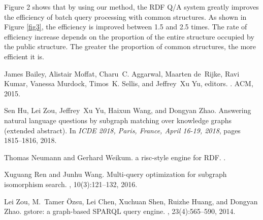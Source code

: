 \documentclass[runningheads]{llncs}
\begin{document}
Figure 2 shows that by using our method, the RDF Q/A system greatly improves the efficiency of batch query processing with common structures. As shown in Figure \ref{fig3}, the efficiency is improved between 1.5 and 2.5 times. The rate of efficiency increase depends on the proportion of the entire structure occupied by the public structure. The greater the proportion of common structures, the more efficient it is.
%
%
% 
% 
%
\begin{thebibliography}{8}
James Bailey, Alistair Moffat, Charu~C. Aggarwal, Maarten de~Rijke, Ravi Kumar,
Vanessa Murdock, Timos~K. Sellis, and Jeffrey~Xu Yu, editors.
. {ACM}, 2015.

Sen Hu, Lei Zou, Jeffrey~Xu Yu, Haixun Wang, and Dongyan Zhao.
\newblock Answering natural language questions by subgraph matching over
knowledge graphs (extended abstract).
\newblock In {\em 
	{ICDE} 2018, Paris, France, April 16-19, 2018}, pages 1815--1816, 2018.

Thomas Neumann and Gerhard Weikum.
 a risc-style engine for {RDF}.
.

Xuguang Ren and Junhu Wang.
\newblock Multi-query optimization for subgraph isomorphism search.
, 10(3):121--132, 2016.

Lei Zou, M.~Tamer {\"{O}}zsu, Lei Chen, Xuchuan Shen, Ruizhe Huang, and Dongyan
Zhao.
\newblock gstore: a graph-based {SPARQL} query engine.
, 23(4):565--590, 2014.
\end{thebibliography}
\end{document}
